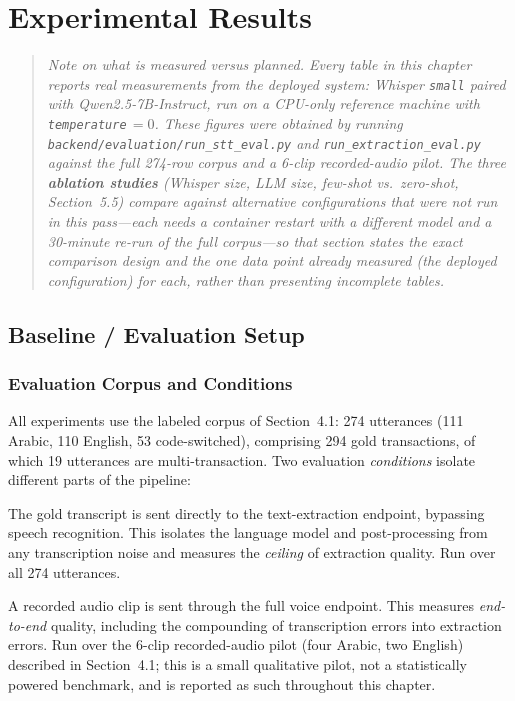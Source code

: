 \chapter{Experimental Results}

\setlength{\parindent}{1em}

\begin{quote}
\small\itshape
Note on what is measured versus planned. Every table in this chapter reports
real measurements from the deployed system: Whisper \texttt{small} paired with
Qwen2.5-7B-Instruct, run on a CPU-only reference machine with
\texttt{temperature}\,$=0$. These figures were obtained by running
\texttt{backend/evaluation/run\_stt\_eval.py} and \texttt{run\_extraction\_eval.py}
against the full 274-row corpus and a 6-clip recorded-audio pilot. The three
\textbf{ablation studies} (Whisper size, LLM size, few-shot vs.\ zero-shot,
Section~5.5) compare against alternative configurations that were not run in
this pass---each needs a container restart with a different model and a
30-minute re-run of the full corpus---so that section states the exact
comparison design and the one data point already measured (the deployed
configuration) for each, rather than presenting incomplete tables.
\end{quote}

\section{Baseline / Evaluation Setup}

\subsection{Evaluation Corpus and Conditions}

All experiments use the labeled corpus of Section~4.1: 274 utterances
(111 Arabic, 110 English, 53 code-switched), comprising 294 gold transactions,
of which 19 utterances are multi-transaction. Two evaluation \emph{conditions}
isolate different parts of the pipeline:

\begin{description}[leftmargin=1.4em, style=nextline]
    \item[Condition (a) --- Gold transcript $\rightarrow$ extraction.] The gold
    transcript is sent directly to the text-extraction endpoint, bypassing speech
    recognition. This isolates the language model and post-processing from any
    transcription noise and measures the \emph{ceiling} of extraction quality.
    Run over all 274 utterances.
    \item[Condition (b) --- Audio $\rightarrow$ STT $\rightarrow$ extraction.] A
    recorded audio clip is sent through the full voice endpoint. This measures
    \emph{end-to-end} quality, including the compounding of transcription errors
    into extraction errors. Run over the 6-clip recorded-audio pilot (four
    Arabic, two English) described in Section~4.1; this is a small qualitative
    pilot, not a statistically powered benchmark, and is reported as such
    throughout this chapter.
\end{description}

